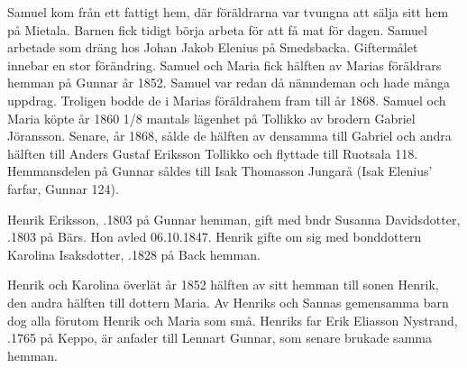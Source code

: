 Samuel kom från ett fattigt hem, där föräldrarna var tvungna att sälja sitt hem på Mietala. Barnen fick tidigt börja arbeta för att få mat för dagen. Samuel arbetade som dräng hos Johan Jakob Elenius på Smedsbacka.	Giftermålet innebar en stor förändring. Samuel och	Maria fick hälften av Marias föräldrars hemman på Gunnar år 1852. Samuel var redan då nämndeman och hade många uppdrag. Troligen bodde de i Marias föräldrahem fram till år 1868. Samuel och Maria köpte år 1860  1/8 mantals lägenhet på Tollikko av brodern Gabriel Jöransson. Senare, år 1868, sålde de hälften av densamma till 	Gabriel och andra hälften till Anders Gustaf Eriksson Tollikko och flyttade  till Ruotsala 118. Hemmansdelen på Gunnar såldes till Isak Thomasson Jungarå (Isak Elenius' farfar, Gunnar 124).


%
Henrik Eriksson, .1803 på Gunnar hemman, gift med bndr Susanna Davidsdotter, .1803 på Bärs. Hon avled 06.10.1847. Henrik gifte om sig med bonddottern Karolina Isaksdotter, .1828 på Back hemman.
\begin{jhchildren}
  \item {}
  \item {}
  \item {}
  \item {}
  \item {}
  \item {}
  \item {}
  \item {}
  \item {}
\end{jhchildren}

Henrik och Karolina överlät år 1852 hälften av sitt hemman till sonen Henrik, den andra hälften till dottern Maria. Av Henriks och Sannas gemensamma barn dog alla förutom Henrik och Maria som små. Henriks far Erik Eliasson Nystrand, .1765 på Keppo, är anfader till Lennart Gunnar, som senare brukade samma hemman.

